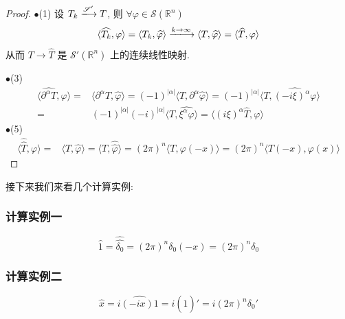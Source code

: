 \documentclass[11pt]{ctexart}[UTF8]
\begin{document}
\begin{proof}\leavevmode
    $\bullet$(1) 设 $T_{k} \xlongrightarrow{\mathscr{S}'} T$, 则 $\forall \varphi \in \mathscr{S}(\mathbb{R}^{n})$
    \begin{equation*}
        \langle \widehat{T_{k}}, \varphi \rangle = \langle T_{k}, \widehat{\varphi} \rangle \xlongrightarrow{k \to \infty} \langle T, \widehat{\varphi} \rangle = \langle \widehat{T}, \varphi \rangle
    \end{equation*}
    从而 $T \longrightarrow \widehat{T}$ 是 $\mathscr{S}'(\mathbb{R}^{n})$ 上的连续线性映射.\par
    $\bullet$(3) \begin{equation*}
        \begin{aligned}
            \langle \widehat{\partial^{\alpha}T}, \varphi \rangle = & \langle \partial^{\alpha}T, \widehat{\varphi} \rangle = (-1)^{|\alpha|} \langle T, \partial^{\alpha}\widehat{\varphi} \rangle = (-1)^{|\alpha|} \langle T, \widehat{(-i\xi)^{\alpha}\varphi} \rangle\\
            = & (-1)^{|\alpha|} (-i)^{|\alpha|} \langle T, \widehat{\xi^{\alpha}\varphi} \rangle = \langle (i\xi)^{\alpha} \widehat{T}, \varphi \rangle
        \end{aligned}
    \end{equation*}
    $\bullet$(5) \begin{equation*}
        \begin{aligned}
            \langle \widehat{\widehat{T}}, \varphi \rangle = & \langle \widehat{T}, \widehat{\varphi} \rangle = \langle T, \widehat{\widehat{\varphi}} \rangle = (2\pi)^n \langle T, \varphi(-x) \rangle = (2\pi)^n \langle T(-x), \varphi(x) \rangle
        \end{aligned}
    \end{equation*}
\end{proof}
接下来我们来看几个计算实例:
\subsubsection*{计算实例一}
\begin{equation*}
    \widehat{1} = \widehat{\widehat{\delta_{0}}} = (2\pi)^n \delta_{0}(-x) = (2\pi)^n \delta_{0}
\end{equation*}
\subsubsection*{计算实例二}
\begin{equation*}
    \widehat{x} = i\widehat{(-ix) 1} = i (\widehat{1})' = i (2\pi)^n \delta_{0}'
\end{equation*}
\end{document}
